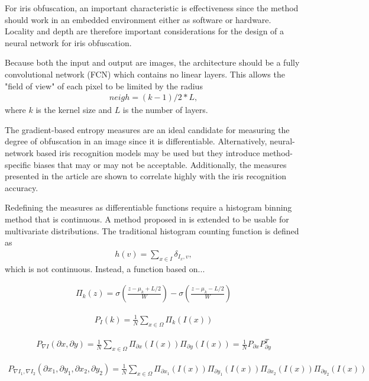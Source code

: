 For iris obfuscation, an important characteristic is effectiveness since the method should work in an embedded environment either as software or hardware. Locality and depth are therefore important considerations for the design of a neural network for iris obfuscation.

Because both the input and output are images, the architecture should be a fully convolutional network (FCN) which contains no linear layers. This allows the "field of view" of each pixel to be limited by the radius
\begin{align}
    neigh = (k-1)/2*L,
\end{align}
where $k$ is the kernel size and $L$ is the number of layers. 

The gradient-based entropy measures are an ideal candidate for measuring the degree of obfuscation in an image since it is differentiable. Alternatively, neural-network based iris recognition models may be used \parencite{nguyen2017iris, gangwar2016deepirisnet} but they introduce method-specific biases that may or may not be acceptable. Additionally, the measures presented in the article are shown to correlate highly with the iris recognition accuracy.

Redefining the measures as differentiable functions require a histogram binning method that is continuous. A method proposed in \parencite{avi2019hue} is extended to be usable for multivariate distributions. The traditional histogram counting function is defined as
\begin{align}
	h(v) = \sum_{x\in I} \delta_{I_x, v},
\end{align}
which is not continuous. Instead, a function based on...

\begin{align}
    \Pi_k(z) = \sigma(\frac{z-\mu_k+L/2}{W}) - \sigma(\frac{z-\mu_k-L/2}{W})
\end{align}

\begin{align}
    P_I(k) = \frac{1}{N}\sum_{x\in\Omega}\Pi_k(I(x))
\end{align}

\begin{align}
    P_{\nabla I}(\partial x, \partial y) = \frac{1}{N}\sum_{x\in\Omega}\Pi_{\partial x}(I(x))\Pi_{\partial y}(I(x)) = \frac{1}{N}P_{\partial x}P_{\partial y}^T
\end{align}

\begin{align}
    P_{\nabla I_1, \nabla I_2}(\partial x_1, \partial y_1, \partial x_2, \partial y_2) = \frac{1}{N}\sum_{x\in\Omega}\Pi_{\partial x_1}(I(x))\Pi_{\partial y_1}(I(x))\Pi_{\partial x_2}(I(x))\Pi_{\partial y_2}(I(x))
\end{align}

